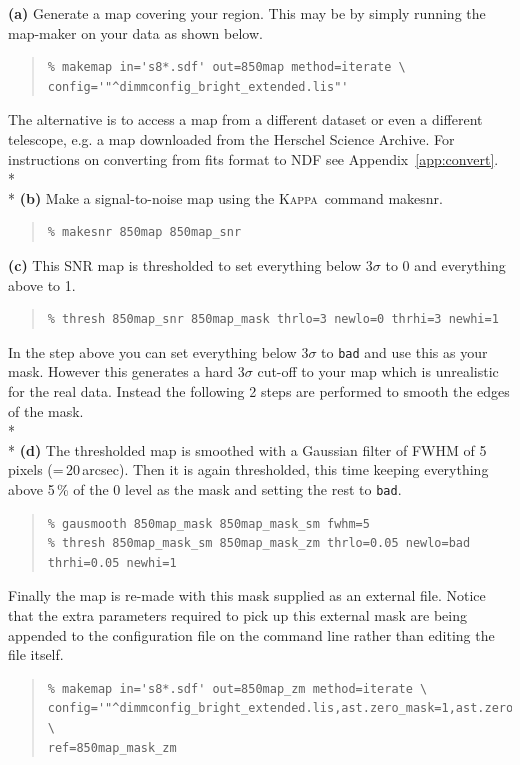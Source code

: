 \documentclass[twoside,11pt]{article}
\newcommand{\htmlref}[2]{#1}
\newcommand{\latexhtml}[2]{#1}
\newcommand{\xref}[3]{#1}
\renewcommand{\_}{\texttt{\symbol{95}}}
\newenvironment{myquote}{\begin{quote}\begin{small}}{\end{small}\end{quote}}
\newcommand{\Kappa}{\xref{\textsc{Kappa}}{sun95}{}}
\newcommand{\task}[1]{\textsf{#1}}
\newcommand{\makesnr}{\xref{\task{makesnr}}{sun95}{MAKESNR}}
\newcommand{\cref}[3]{\latexhtml{#1~\ref{#2}}{\htmlref{#3}{#2}}}
\begin{document}
\textbf{(a)} Generate a map covering your region. This may be by simply
running the map-maker on your data as shown below.
\begin{myquote}
\begin{verbatim}
% makemap in='s8*.sdf' out=850map method=iterate \
config='"^dimmconfig_bright_extended.lis"'
\end{verbatim}
\end{myquote}
The alternative is to access a map from a different dataset or even a
different telescope, e.g. a map downloaded from the Herschel Science
Archive. For instructions on converting from fits format to NDF see
\cref{Appendix}{app:convert}{Converting a Herschel map to NDF}.
\\*\\*
\textbf{(b)} Make a signal-to-noise map using the \Kappa\ command \makesnr.
\begin{myquote}
\begin{verbatim}
% makesnr 850map 850map_snr
\end{verbatim}
\end{myquote}
\textbf{(c)} This SNR map is thresholded to set everything below 3$\sigma$ to 0 and
everything above to 1.
\begin{myquote}
\begin{verbatim}
% thresh 850map_snr 850map_mask thrlo=3 newlo=0 thrhi=3 newhi=1
\end{verbatim}
\end{myquote}
In the step above you can set everything below 3$\sigma$ to
\texttt{bad} and use this as your mask. However this generates a hard
3$\sigma$ cut-off to your map which is unrealistic for the real data.
Instead the following 2 steps are performed to smooth the edges of the
mask.
\\*\\*
\textbf{(d)} The thresholded map is smoothed with a Gaussian filter
of FWHM of 5 pixels (=\,20\,arcsec). Then it is again thresholded, this time
keeping everything above 5\,\% of the 0 level as the mask and setting
the rest to \texttt{bad}.
\begin{myquote}
\begin{verbatim}
% gausmooth 850map_mask 850map_mask_sm fwhm=5
% thresh 850map_mask_sm 850map_mask_zm thrlo=0.05 newlo=bad thrhi=0.05 newhi=1
\end{verbatim}
\end{myquote}
Finally the map is re-made with this mask supplied as an external
file. Notice that the extra parameters required to pick up this external
mask are being appended to the configuration file on the command line
rather than editing the file itself.
\begin{myquote}
\begin{verbatim}
% makemap in='s8*.sdf' out=850map_zm method=iterate \
config='"^dimmconfig_bright_extended.lis,ast.zero_mask=1,ast.zero_snr=0"' \
ref=850map_mask_zm
\end{verbatim}
\end{myquote}
\end{document}
